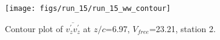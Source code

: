 \begin{figure}[H]
\centering
\texttt{[image: figs/run\_15/run\_15\_ww\_contour]}
\caption{Contour plot of $\overline{v_{z}^{\prime} v_{z}^{\prime}}$ at $z/c$=6.97, $V_{free}$=23.21, station 2.}
\label{fig:run_15_ww_contour}
\end{figure}


